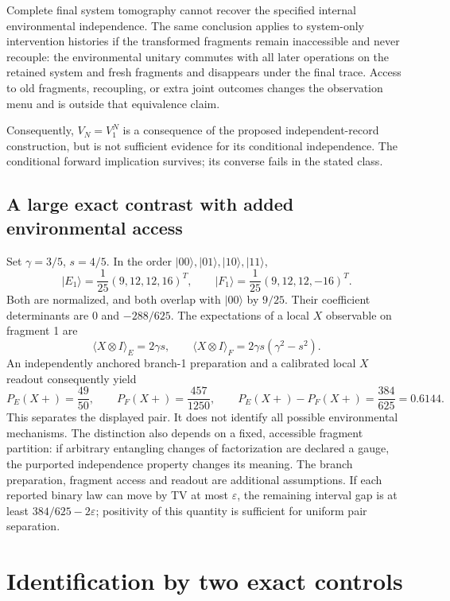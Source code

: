 \documentclass[11pt,letterpaper]{article}
\newcommand{\ket}[1]{\lvert #1\rangle}
\begin{document}
Complete final system tomography cannot recover the specified internal environmental independence. The same conclusion applies to system-only intervention histories if the transformed fragments remain inaccessible and never recouple: the environmental unitary commutes with all later operations on the retained system and fresh fragments and disappears under the final trace. Access to old fragments, recoupling, or extra joint outcomes changes the observation menu and is outside that equivalence claim.

Consequently, $V_N=V_1^N$ is a consequence of the proposed independent-record construction, but is not sufficient evidence for its conditional independence. The conditional forward implication survives; its converse fails in the stated class.

\subsection{A large exact contrast with added environmental access}

Set $\gamma=3/5$, $s=4/5$. In the order $\ket{00},\ket{01},\ket{10},\ket{11}$,
\[
 \ket{E_1}=\frac1{25}(9,12,12,16)^T,\qquad
 \ket{F_1}=\frac1{25}(9,12,12,-16)^T.
\]
Both are normalized, and both overlap with $\ket{00}$ by $9/25$. Their coefficient determinants are $0$ and $-288/625$. The expectations of a local \(X\) observable on fragment 1 are
\[
 \langle X\otimes I\rangle_E=2\gamma s,\qquad
 \langle X\otimes I\rangle_F=2\gamma s(\gamma^2-s^2).
\]
An independently anchored branch-1 preparation and a calibrated local \(X\)
readout consequently yield
\[
 P_E(X+)=\frac{49}{50},\qquad P_F(X+)=\frac{457}{1250},
 \qquad P_E(X+)-P_F(X+)=\frac{384}{625}=0.6144.
\]
This separates the displayed pair. It does not identify all possible environmental mechanisms. The distinction also depends on a fixed, accessible fragment partition: if arbitrary entangling changes of factorization are declared a gauge, the purported independence property changes its meaning. The branch preparation, fragment access and readout are additional
assumptions. If each reported binary law can move by TV at most \(\varepsilon\),
the remaining interval gap is at least \(384/625-2\varepsilon\); positivity of
this quantity is sufficient for uniform pair separation.



\section{Identification by two exact controls}
\end{document}

